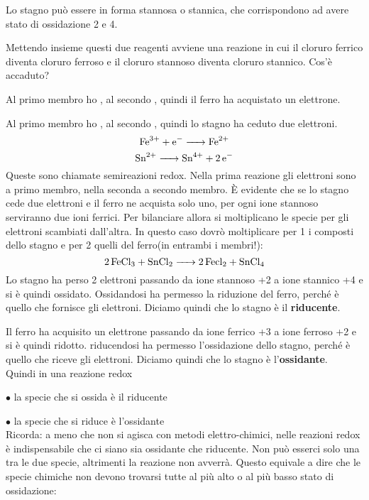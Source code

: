 Lo stagno può essere in forma stannosa o stannica, che corrispondono ad avere stato di ossidazione 2 e 4.

Mettendo insieme questi due reagenti avviene una reazione in cui il cloruro ferrico diventa cloruro ferroso e il cloruro stannoso diventa cloruro stannico. Cos'è accaduto?

Al primo membro ho , al secondo , quindi il ferro ha acquistato un elettrone.

Al primo membro ho , al secondo , quindi lo stagno ha ceduto due elettroni.
$$\ce{Fe^{3+} + e^- -> Fe^{2+}}$$
$$\ce{Sn^{2+} -> Sn^{4+} + 2 e^-}$$
Queste sono chiamate semireazioni redox.
Nella prima reazione gli elettroni sono a primo membro, nella seconda a secondo membro.
È evidente che se lo stagno cede due elettroni e il ferro ne acquista solo uno, per ogni ione stannoso serviranno due ioni ferrici.
Per bilanciare allora si moltiplicano le specie per gli elettroni scambiati dall'altra.
In questo caso dovrò moltiplicare per 1 i composti dello stagno e per 2 quelli del ferro(in entrambi i membri!):
$$\ce{2 FeCl_3 + SnCl_2 -> 2 Fecl_2 + SnCl_4}$$
Lo stagno ha perso 2 elettroni passando da ione stannoso +2 a ione stannico +4 e si è quindi ossidato. Ossidandosi ha permesso la riduzione del ferro, perché è quello che fornisce gli elettroni. Diciamo quindi che lo stagno è il \textbf{riducente}.

Il ferro ha acquisito un elettrone passando da ione ferrico +3 a ione ferroso +2 e si è quindi ridotto. riducendosi ha permesso l'ossidazione dello stagno, perché è quello che riceve gli elettroni. Diciamo quindi che lo stagno è l'\textbf{ossidante}.\\

Quindi in una reazione redox

$\bullet$ la specie che si ossida è il riducente

$\bullet$ la specie che si riduce è l'ossidante\\

Ricorda: a meno che non si agisca con metodi elettro-chimici, nelle reazioni redox è indispensabile che ci siano sia ossidante che riducente. Non può esserci solo una tra le due specie, altrimenti la reazione non avverrà. Questo equivale a dire che le specie chimiche non devono trovarsi tutte al più alto o al più basso stato di ossidazione:

